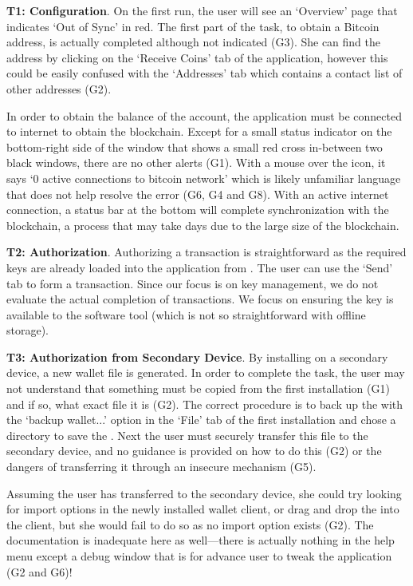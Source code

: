 \textbf{T1: Configuration}. 
On the first run, the user will see an `Overview' page that indicates `Out of Sync' in red. The first part of the task, to obtain a Bitcoin address, is actually completed although not indicated (G3). She can find the address by clicking on the `Receive Coins' tab of the application, however this could be easily confused with the `Addresses' tab which contains a contact list of other addresses (G2).

In order to obtain the balance of the account, the application must be connected to internet to obtain the blockchain. Except for a small status indicator on the bottom-right side of the window that shows a small red cross in-between two black windows, there are no other alerts (G1). With a mouse over the icon, it says `0 active connections to bitcoin network' which is likely unfamiliar language that does not help resolve the error (G6, G4 and G8). With an active internet connection, a status bar at the bottom will complete synchronization with the blockchain, a process that may take days due to the large size of the blockchain. 

\textbf{T2: Authorization}.
Authorizing a transaction is straightforward as the required keys are already loaded into the application from \walletfile. The user can use the `Send' tab to form a transaction. Since our focus is on key management, we do not evaluate the actual completion of transactions. We focus on ensuring the key is available to the software tool (which is not so straightforward with \eg offline storage). 

\textbf{T3: Authorization from Secondary Device}.
By installing \bitcoinclient on a secondary device, a new wallet file is generated. In order to complete the task, the user may not understand that something must be copied from the first installation (G1) and if so, what exact file it is (G2). The correct procedure is to back up the \walletfile with the `backup wallet...' option in the `File' tab of the first installation and chose a directory to save the \walletfile. Next the user must securely transfer this file to the secondary device, and no guidance is provided on how to do this (G2) or the dangers of transferring it through an insecure mechanism (G5).

Assuming the user has transferred \walletfile to the secondary device, she could try looking for import options in the newly installed wallet client, or drag and drop the \walletfile into the client, but she would fail to do so as no import option exists (G2). The documentation is inadequate here as well---there is actually nothing in the help menu except a debug window that is for advance user to tweak the application (G2 and G6)!

